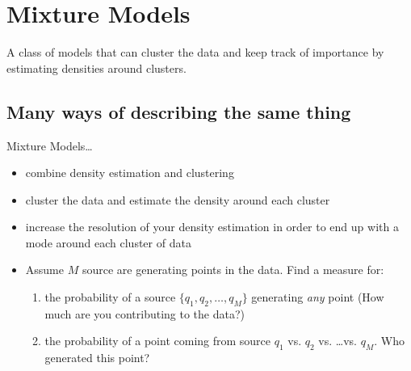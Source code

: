 \section{Mixture Models}


\begin{frame} 
    \begin{center} \large
        A class of models that can cluster the data and keep track of importance by estimating densities around clusters.
    \end{center}
	
\end{frame}

\subsection{Many ways of describing the same thing}

\begin{frame}{\subsecname}

Mixture Models\ldots
\begin{itemize}
\item combine density estimation and clustering
\item cluster the data and estimate the density around each cluster
\item increase the resolution of your density estimation in order to end up with a mode around each cluster of data
\item Assume $M$ source are generating points in the data. Find a measure for:
	\begin{enumerate}
	\item the probability of a source $\{q_1,q_2,\ldots,q_M\}$ generating \emph{any} point (How much are you contributing to the data?)
	\item the probability of a point coming from source $q_1$ vs. $q_2$ vs. \ldots vs. $q_M$. Who generated this point?
	\end{enumerate}
\end{itemize}

\end{frame}

